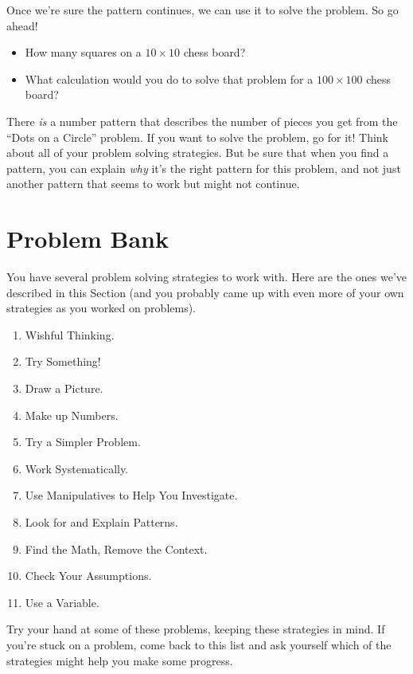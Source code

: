 Once we're sure the pattern continues, we can use it to solve the problem.  So go ahead!  
\begin{itemize}
\item
How many squares on a $10 \times 10$ chess board?    
\item
What calculation would you do to solve that problem for a $100 \times 100$ chess board?
\end{itemize}


There \emph{is} a number pattern that describes the number of pieces you get from the ``Dots on a Circle'' problem.  If you want to solve the problem, go for it!  Think about all of your problem solving strategies.  But be sure that when you find a pattern, you can explain \emph{why} it's the right pattern for this problem, and not just another pattern that seems to work but might not continue.


\section{Problem Bank}\label{sec:ProblemBank}
You have several problem solving strategies to work with.  Here are the ones we've described in this Section (and you probably came up with even more of your own strategies as you worked on problems).
\begin{enumerate}
\item
Wishful Thinking.
\item
Try Something!
\item
Draw a Picture.
\item
Make up Numbers.
\item
Try a Simpler Problem.
\item
Work Systematically.
\item
Use Manipulatives to Help You Investigate.
\item
Look for and Explain Patterns.
\item
Find the Math, Remove the Context.
\item
Check Your Assumptions.
\item
Use a Variable.
\end{enumerate}

Try your hand at some of these problems, keeping these strategies in mind.  If you're stuck on a problem, come back to this list and ask yourself which of the strategies might help you make some progress.





